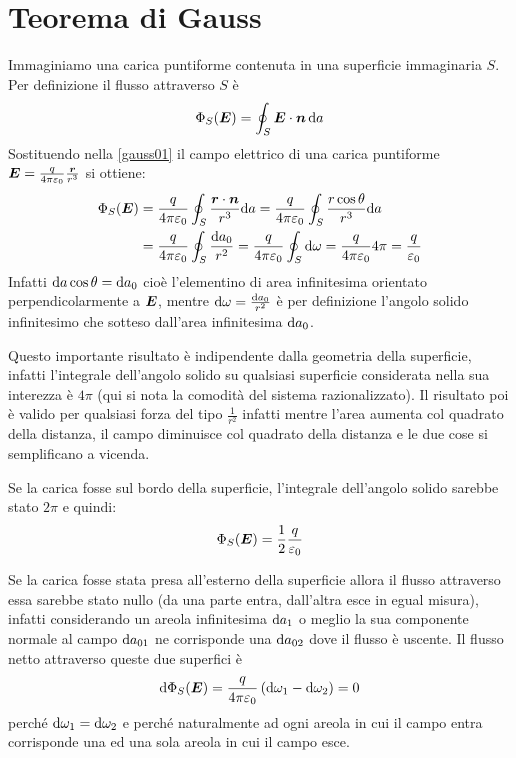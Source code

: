 \section{Teorema di Gauss}
\label{teorema_di_gauss}
Immaginiamo una carica puntiforme contenuta in una superficie immaginaria $S$. Per definizione il flusso attraverso $S$ è 
\begin{equation}
\Phi_S(\boldsymbol{E})=\oint_S\boldsymbol{E}\cdot\boldsymbol{n}\,\mathrm{d} a
\label{gauss01}
\end{equation}
Sostituendo nella \eqref{gauss01} il campo elettrico di una carica puntiforme $\boldsymbol{E}=\frac{q}{4\pi\varepsilon_0}\frac{\boldsymbol{r}}{r^3}$ si ottiene:
\begin{align*}
\Phi_S(\boldsymbol{E})&=\frac{q}{4\pi\varepsilon_0}\oint_S\frac{\boldsymbol{r}\cdot\boldsymbol{n}}{r^3}\mathrm{d} a=\frac{q}{4\pi\varepsilon_0}\oint_S\frac{r\cos\theta}{r^3}\mathrm{d} a\\
&=\frac{q}{4\pi\varepsilon_0}\oint_S\frac{\mathrm{d} a_0}{r^2}=\frac{q}{4\pi\varepsilon_0}\oint_S\mathrm{d}\omega=\frac{q}{4\pi\varepsilon_0}4\pi=\frac{q}{\varepsilon_0}
\end{align*}
Infatti $\mathrm{d} a\cos\theta=\mathrm{d} a_0$ cioè l'elementino di area infinitesima orientato perpendicolarmente a $\boldsymbol{E}$, mentre $\mathrm{d} \omega=\frac{\mathrm{d} a_0}{r^2}$ è per definizione l'angolo solido infinitesimo che sotteso dall'area infinitesima $\mathrm{d} a_0$.

Questo importante risultato è indipendente dalla geometria della superficie, infatti l'integrale dell'angolo solido su qualsiasi superficie considerata nella sua interezza è $4\pi$ (qui si nota la comodità del sistema razionalizzato). Il risultato poi è valido per qualsiasi forza del tipo $\frac{1}{r^2}$ infatti mentre l'area aumenta col quadrato della distanza, il campo diminuisce col quadrato della distanza e le due cose si semplificano a vicenda.

Se la carica fosse sul bordo della superficie, l'integrale dell'angolo solido sarebbe stato $2\pi$ e quindi:
\begin{equation*}\Phi_S(\boldsymbol{E})=\frac{1}{2}\frac{q}{\varepsilon_0}\end{equation*}

Se la carica fosse stata presa all'esterno della superficie allora il flusso attraverso essa sarebbe stato nullo (da una parte entra, dall'altra esce in egual misura), infatti considerando un areola infinitesima $\mathrm{d} a_1$ o meglio la sua componente normale al campo $\mathrm{d} a_{01}$ ne corrisponde una $\mathrm{d} a_{02}$ dove il flusso è uscente. Il flusso netto attraverso queste due superfici è \begin{equation*}\mathrm{d}\Phi_S(\boldsymbol{E})=\frac{q}{4\pi\varepsilon_0}\left(\mathrm{d}\omega_1-\mathrm{d}\omega_2\right)=0\end{equation*}
perché $\mathrm{d}\omega_1=\mathrm{d}\omega_2$ e perché naturalmente ad ogni areola in cui il campo entra corrisponde una ed una sola areola in cui il campo esce.

